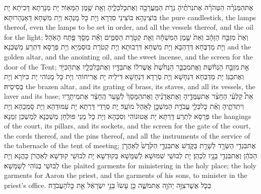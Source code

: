 {אֶת\maqqaf הַמְּנֹרָ֨ה הַטְּהֹרָ֜ה אֶת\maqqaf נֵרֹתֶ֗יהָ נֵרֹ֛ת הַמַּֽעֲרָכָ֖ה וְאֶת\maqqaf כׇּל\maqqaf כֵּלֶ֑יהָ וְאֵ֖ת שֶׁ֥מֶן הַמָּאֽוֹר׃}
{יָת מְנָרְתָא דָּכִיתָא יָת בּוֹצִינַהָא בּוֹצִינֵי סִדְרָא וְיָת כָּל מָנַהָא וְיָת מִשְׁחָא דְּאַנְהָרוּתָא׃}
{the pure candlestick, the lamps thereof, even the lamps to be set in order, and all the vessels thereof, and the oil for the light;}{}
{וְאֵת֙ מִזְבַּ֣ח הַזָּהָ֔ב וְאֵת֙ שֶׁ֣מֶן הַמִּשְׁחָ֔ה וְאֵ֖ת קְטֹ֣רֶת הַסַּמִּ֑ים וְאֵ֕ת מָסַ֖ךְ פֶּ֥תַח הָאֹֽהֶל׃}
{וְיָת מַדְבְּחָא דְּדַהְבָּא וְיָת מִשְׁחָא דִּרְבוּתָא וְיָת קְטֹרֶת בּוּסְמַיָּא וְיָת פְּרָסָא דִּתְרַע מַשְׁכְּנָא׃}
{and the golden altar, and the anointing oil, and the sweet incense, and the screen for the door of the Tent;}{}
{אֵ֣ת \legarmeh  מִזְבַּ֣ח הַנְּחֹ֗שֶׁת וְאֶת\maqqaf מִכְבַּ֤ר הַנְּחֹ֙שֶׁת֙ אֲשֶׁר\maqqaf ל֔וֹ אֶת\maqqaf בַּדָּ֖יו וְאֶת\maqqaf כׇּל\maqqaf כֵּלָ֑יו אֶת\maqqaf הַכִּיֹּ֖ר וְאֶת\maqqaf כַּנּֽוֹ׃}
{יָת מַדְבְּחָא דִּנְחָשָׁא וְיָת סְרָדָא דִּנְחָשָׁא דִּילֵיהּ יָת אֲרִיחוֹהִי וְיָת כָּל מָנוֹהִי יָת כִּיּוֹרָא וְיָת בְּסִיסֵיהּ׃}
{the brazen altar, and its grating of brass, its staves, and all its vessels, the laver and its base;}{}
{אֵת֩ קַלְעֵ֨י הֶחָצֵ֜ר אֶת\maqqaf עַמֻּדֶ֣יהָ וְאֶת\maqqaf אֲדָנֶ֗יהָ וְאֶת\maqqaf הַמָּסָךְ֙ לְשַׁ֣עַר הֶֽחָצֵ֔ר אֶת\maqqaf מֵיתָרָ֖יו וִיתֵדֹתֶ֑יהָ וְאֵ֗ת כׇּל\maqqaf כְּלֵ֛י עֲבֹדַ֥ת הַמִּשְׁכָּ֖ן לְאֹ֥הֶל מוֹעֵֽד׃}
{יָת סְרָדֵי דָּרְתָא יָת עַמּוּדַהָא וְיָת סָמְכַהָא וְיָת פְּרָסָא לִתְרַע דָּרְתָא יָת אֲטוּנוֹהִי וְסִכַּהָא וְיָת כָּל מָנֵי פּוּלְחַן מַשְׁכְּנָא לְמַשְׁכַּן זִמְנָא׃}
{the hangings of the court, its pillars, and its sockets, and the screen for the gate of the court, the cords thereof, and the pins thereof, and all the instruments of the service of the tabernacle of the tent of meeting;}{}
{אֶת\maqqaf בִּגְדֵ֥י הַשְּׂרָ֖ד לְשָׁרֵ֣ת בַּקֹּ֑דֶשׁ אֶת\maqqaf בִּגְדֵ֤י הַקֹּ֙דֶשׁ֙ לְאַהֲרֹ֣ן הַכֹּהֵ֔ן וְאֶת\maqqaf בִּגְדֵ֥י בָנָ֖יו לְכַהֵֽן׃}
{יָת לְבוּשֵׁי שִׁמּוּשָׁא לְשַׁמָּשָׁא בְּקוּדְשָׁא יָת לְבוּשֵׁי קוּדְשָׁא לְאַהֲרֹן כָּהֲנָא וְיָת לְבוּשֵׁי בְנוֹהִי לְשַׁמָּשָׁא׃}
{the plaited garments for ministering in the holy place; the holy garments for Aaron the priest, and the garments of his sons, to minister in the priest’s office.}{}
{כְּכֹ֛ל אֲשֶׁר\maqqaf צִוָּ֥ה יְהֹוָ֖ה אֶת\maqqaf מֹשֶׁ֑ה כֵּ֤ן עָשׂוּ֙ בְּנֵ֣י יִשְׂרָאֵ֔ל אֵ֖ת כׇּל\maqqaf הָעֲבֹדָֽה׃}
